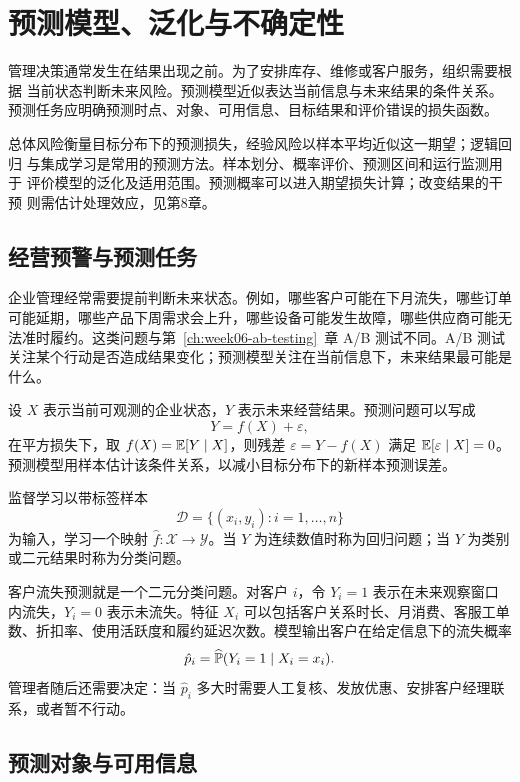 \chapter{预测模型、泛化与不确定性}
\label{ch:week07-prediction}

管理决策通常发生在结果出现之前。为了安排库存、维修或客户服务，组织需要根据
当前状态判断未来风险。预测模型近似表达当前信息与未来结果的条件关系。
预测任务应明确预测时点、对象、可用信息、目标结果和评价错误的损失函数。

总体风险衡量目标分布下的预测损失，经验风险以样本平均近似这一期望；逻辑回归
与集成学习是常用的预测方法。样本划分、概率评价、预测区间和运行监测用于
评价模型的泛化及适用范围。预测概率可以进入期望损失计算；改变结果的干预
则需估计处理效应，见第8章。

\section{经营预警与预测任务}

企业管理经常需要提前判断未来状态。例如，哪些客户可能在下月流失，哪些订单可能延期，哪些产品下周需求会上升，哪些设备可能发生故障，哪些供应商可能无法准时履约。这类问题与第~\ref{ch:week06-ab-testing}~章 A/B 测试不同。A/B 测试关注某个行动是否造成结果变化；预测模型关注在当前信息下，未来结果最可能是什么。

设 \(X\) 表示当前可观测的企业状态，\(Y\) 表示未来经营结果。预测问题可以写成
\[
  Y=f(X)+\varepsilon,
\]
在平方损失下，取 \(f(X)=\mathbb E[Y\mid X]\)，则残差 \(\varepsilon=Y-f(X)\) 满足 \(\mathbb E[\varepsilon\mid X]=0\)。预测模型用样本估计该条件关系，以减小目标分布下的新样本预测误差。

\begin{definition}[监督学习]
监督学习以带标签样本
\[
  \mathcal D=\{(x_i,y_i):i=1,\ldots,n\}
\]
为输入，学习一个映射 \(\hat f:\mathcal X\rightarrow \mathcal Y\)。当 \(Y\) 为连续数值时称为回归问题；当 \(Y\) 为类别或二元结果时称为分类问题。
\end{definition}

客户流失预测就是一个二元分类问题。对客户 \(i\)，令 \(Y_i=1\) 表示在未来观察窗口内流失，\(Y_i=0\) 表示未流失。特征 \(X_i\) 可以包括客户关系时长、月消费、客服工单数、折扣率、使用活跃度和履约延迟次数。模型输出客户在给定信息下的流失概率
\[
  \hat p_i=\widehat{\mathbb P}(Y_i=1\mid X_i=x_i).
\]
管理者随后还需要决定：当 \(\hat p_i\) 多大时需要人工复核、发放优惠、安排客户经理联系，或者暂不行动。

\section{预测对象与可用信息}
